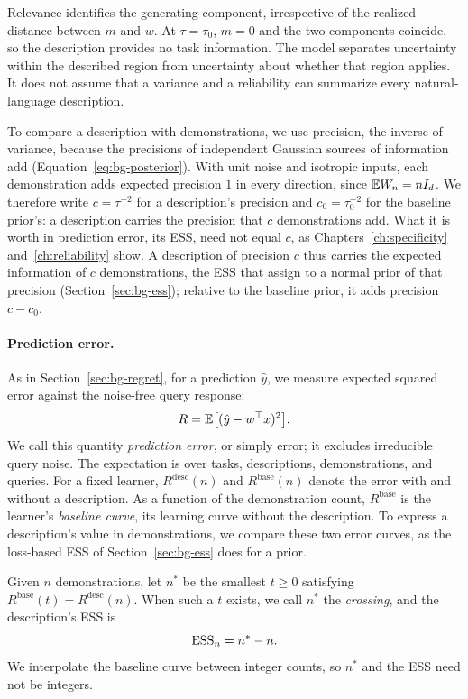 Relevance identifies the generating component, irrespective of the realized distance between $m$ and $w$. At $\tau=\tau_0$, $m=0$ and the two components coincide, so the description provides no task information. The model separates uncertainty within the described region from uncertainty about whether that region applies. It does not assume that a variance and a reliability can summarize every natural-language description.

To compare a description with demonstrations, we use precision, the inverse of variance, because the precisions of independent Gaussian sources of information add (Equation~\eqref{eq:bg-posterior}). With unit noise and isotropic inputs, each demonstration adds expected precision $1$ in every direction, since $\mathbb{E} W_n=nI_d$. We therefore write $c=\tau^{-2}$ for a description's precision and $c_0=\tau_0^{-2}$ for the baseline prior's: a description carries the precision that $c$ demonstrations add. What it is worth in prediction error, its ESS, need not equal $c$, as Chapters~\ref{ch:specificity} and~\ref{ch:reliability} show. A description of precision $c$ thus carries the expected information of $c$ demonstrations, the ESS that \citet{morita2008} assign to a normal prior of that precision (Section~\ref{sec:bg-ess}); relative to the baseline prior, it adds precision $c-c_0$.

\paragraph{Prediction error.}
As in Section~\ref{sec:bg-regret}, for a prediction $\hat y$, we measure expected squared error against the noise-free query response:
\begin{equation}\label{eq:regret}
R=\mathbb{E}\big[(\hat y-w^\top x)^2\big].
\end{equation}
We call this quantity \emph{prediction error}, or simply error; it excludes irreducible query noise. The expectation is over tasks, descriptions, demonstrations, and queries. For a fixed learner, $R^{\mathrm{desc}}(n)$ and $R^{\mathrm{base}}(n)$ denote the error with and without a description. As a function of the demonstration count, $R^{\mathrm{base}}$ is the learner's \emph{baseline curve}, its learning curve without the description. To express a description's value in demonstrations, we compare these two error curves, as the loss-based ESS of Section~\ref{sec:bg-ess} does for a prior.

\begin{definition}\label{def:ess}
Given $n$ demonstrations, let $n^*$ be the smallest $t\geq0$ satisfying $R^{\mathrm{base}}(t)=R^{\mathrm{desc}}(n)$. When such a $t$ exists, we call $n^*$ the \emph{crossing}, and the description's ESS is
\[
\mathrm{ESS}_n=n^*-n.
\]
We interpolate the baseline curve between integer counts, so $n^*$ and the ESS need not be integers.
\end{definition}

